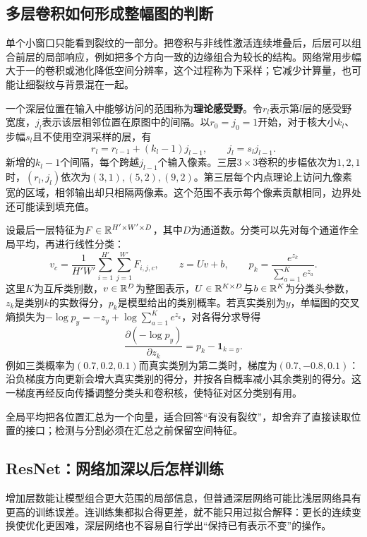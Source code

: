 \subsection{多层卷积如何形成整幅图的判断}
单个小窗口只能看到裂纹的一部分。把卷积与非线性激活连续堆叠后，后层可以组合前层的局部响应，例如把多个方向一致的边缘组合为较长的结构。网络常用步幅大于一的卷积或池化降低空间分辨率，这个过程称为下采样；它减少计算量，也可能让细裂纹与背景混在一起。

一个深层位置在输入中能够访问的范围称为\textbf{理论感受野}。令$r_l$表示第$l$层的感受野宽度，$j_l$表示该层相邻位置在原图中的间隔。以$r_0=j_0=1$开始，对于核大小$k_l$、步幅$s_l$且不使用空洞采样的层，有
\begin{equation}
 r_l=r_{l-1}+(k_l-1)j_{l-1},\qquad j_l=s_lj_{l-1}.
 \label{eq:vision-receptive-field}
\end{equation}
新增的$k_l-1$个间隔，每个跨越$j_{l-1}$个输入像素。三层$3\times3$卷积的步幅依次为$1,2,1$时，$(r_l,j_l)$依次为$(3,1),(5,2),(9,2)$。第三层每个内点理论上访问九像素宽的区域，相邻输出却只相隔两像素。这个范围不表示每个像素贡献相同，边界处还可能读到填充值。

设最后一层特征为$F\in\mathbb{R}^{H'\times W'\times D}$，其中$D$为通道数。分类可以先对每个通道作全局平均，再进行线性分类：
\begin{equation}
 v_c=\frac{1}{H'W'}\sum_{i=1}^{H'}\sum_{j=1}^{W'}F_{i,j,c},\qquad
 z=Uv+b,\qquad p_k=\frac{e^{z_k}}{\sum_{a=1}^{K}e^{z_a}}.
 \label{eq:vision-classification}
\end{equation}
这里$K$为互斥类别数，$v\in\mathbb{R}^D$为整图表示，$U\in\mathbb{R}^{K\times D}$与$b\in\mathbb{R}^K$为分类头参数，$z_k$是类别$k$的实数得分，$p_k$是模型给出的类别概率。若真实类别为$y$，单幅图的交叉熵损失为$-\log p_y=-z_y+\log\sum_{a=1}^K e^{z_a}$，对各得分求导得
\[
 \frac{\partial(-\log p_y)}{\partial z_k}=p_k-\mathbf1_{k=y}.
\]
例如三类概率为$(0.7,0.2,0.1)$而真实类别为第二类时，梯度为$(0.7,-0.8,0.1)$：沿负梯度方向更新会增大真实类别的得分，并按各自概率减小其余类别的得分。这一梯度再经反向传播调整分类头和卷积核，使特征对区分类别有用。

全局平均把各位置汇总为一个向量，适合回答“有没有裂纹”，却舍弃了直接读取位置的接口；检测与分割必须在汇总之前保留空间特征。

\subsection{ResNet：网络加深以后怎样训练}
增加层数能让模型组合更大范围的局部信息，但普通深层网络可能比浅层网络具有更高的训练误差。连训练集都拟合得更差，就不能只用过拟合解释：更长的连续变换使优化更困难，深层网络也不容易自行学出“保持已有表示不变”的操作。

